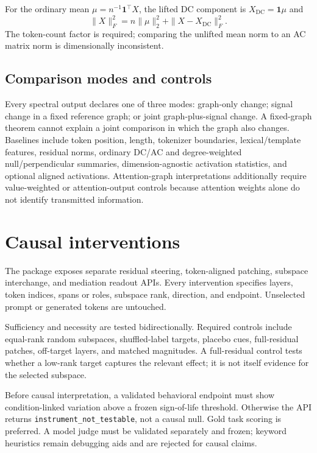 \documentclass[10pt]{article}
\begin{document}
For the ordinary mean $\mu=n^{-1}\mathbf{1}^\top X$, the lifted DC component is $X_{\mathrm{DC}}=\mathbf{1}\mu$ and
\begin{equation}
\|X\|_F^2=n\|\mu\|_2^2+\|X-X_{\mathrm{DC}}\|_F^2.
\end{equation}
The token-count factor is required; comparing the unlifted mean norm to an AC matrix norm is dimensionally inconsistent.

\subsection{Comparison modes and controls}

Every spectral output declares one of three modes: graph-only change; signal change in a fixed reference graph; or joint graph-plus-signal change. A fixed-graph theorem cannot explain a joint comparison in which the graph also changes. Baselines include token position, length, tokenizer boundaries, lexical/template features, residual norms, ordinary DC/AC and degree-weighted null/perpendicular summaries, dimension-agnostic activation statistics, and optional aligned activations. Attention-graph interpretations additionally require value-weighted or attention-output controls because attention weights alone do not identify transmitted information.

\section{Causal interventions}

The package exposes separate residual steering, token-aligned patching, subspace interchange, and mediation readout APIs. Every intervention specifies layers, token indices, spans or roles, subspace rank, direction, and endpoint. Unselected prompt or generated tokens are untouched.

Sufficiency and necessity are tested bidirectionally. Required controls include equal-rank random subspaces, shuffled-label targets, placebo cues, full-residual patches, off-target layers, and matched magnitudes. A full-residual control tests whether a low-rank target captures the relevant effect; it is not itself evidence for the selected subspace.

Before causal interpretation, a validated behavioral endpoint must show condition-linked variation above a frozen sign-of-life threshold. Otherwise the API returns \texttt{instrument\_not\_testable}, not a causal null. Gold task scoring is preferred. A model judge must be validated separately and frozen; keyword heuristics remain debugging aids and are rejected for causal claims.
\end{document}
